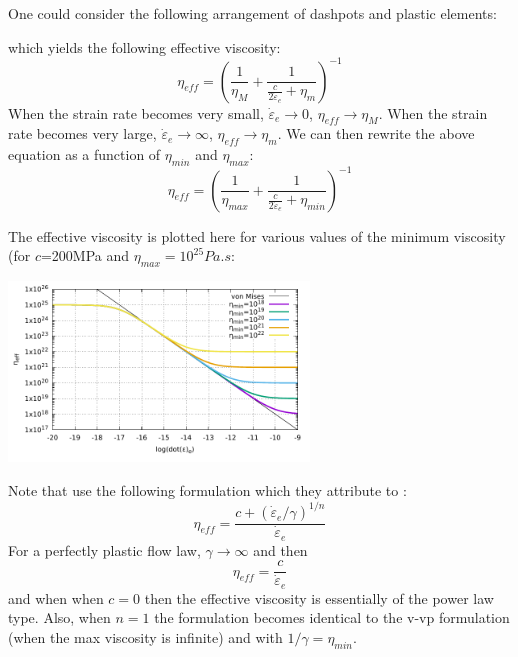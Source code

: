 One could consider the following arrangement of dashpots and plastic elements:

\begin{center}
\begin{minipage}[t]{0.5\textwidth}

\end{minipage}
\end{center}

 which yields the following effective viscosity:
\[
\eta_{eff} = \left( \frac{1}{\eta_M}  + \frac{1}{\frac{c}{2 \dot{\varepsilon}_e} + \eta_m}  \right)^{-1}
\]
When the strain rate becomes very small,  $\dot{\varepsilon}_e \rightarrow 0$, $\eta_{eff}\rightarrow \eta_{M}$.
When the strain rate becomes very large,  $\dot{\varepsilon}_e \rightarrow \infty$, $\eta_{eff}\rightarrow \eta_{m}$.
We can then rewrite the above equation as a function of $\eta_{min}$ and $\eta_{max}$:
\[
\eta_{eff} = \left( \frac{1}{\eta_{max}}  + \frac{1}{\frac{c}{2 \dot{\varepsilon}_e} + \eta_{min}}  \right)^{-1}
\]

The effective viscosity is plotted here for various values of the minimum viscosity (for $c$=200MPa and $\eta_{max}=10^{25}Pa.s$:

\includegraphics[width=8cm]{images/viscoplasticity/nu_eff}




Note that \cite{vidm82,vidm84,vimd86,zivt85} use the following formulation which they attribute to \cite{zijo78}:
\[
\eta_{eff} = \frac{c + (\dot{\varepsilon}_e / \gamma)^{1/n}}{ \dot{\varepsilon}_e }
\] 
For a perfectly plastic flow law, $\gamma \rightarrow \infty$ and then 
\[
\eta_{eff} = \frac{c}{ \dot{\varepsilon}_e }
\] 
and when when $c=0$ then the effective viscosity is essentially of the power law type.
Also, when $n=1$ the formulation becomes identical to the v-vp formulation (when the max viscosity is infinite) and with $1/\gamma=\eta_{min}$.





